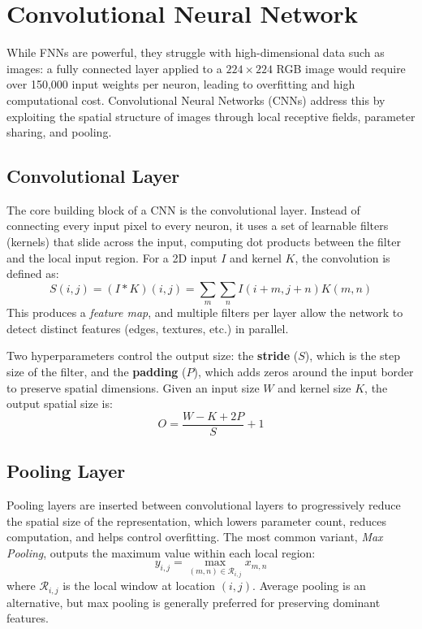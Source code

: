 \section{Convolutional Neural Network}

While FNNs are powerful, they struggle with high-dimensional data such as images: a fully connected layer applied to a $224 \times 224$ RGB image would require over 150,000 input weights per neuron, leading to overfitting and high computational cost. Convolutional Neural Networks (CNNs) address this by exploiting the spatial structure of images through local receptive fields, parameter sharing, and pooling.

\subsection{Convolutional Layer}
The core building block of a CNN is the convolutional layer. Instead of connecting every input pixel to every neuron, it uses a set of learnable filters (kernels) that slide across the input, computing dot products between the filter and the local input region. For a 2D input $I$ and kernel $K$, the convolution is defined as:
\begin{equation}
    S(i, j) = (I * K)(i, j) = \sum_{m} \sum_{n} I(i+m, j+n) K(m, n)
\end{equation}
This produces a \textit{feature map}, and multiple filters per layer allow the network to detect distinct features (edges, textures, etc.) in parallel.

Two hyperparameters control the output size: the \textbf{stride} ($S$), which is the step size of the filter, and the \textbf{padding} ($P$), which adds zeros around the input border to preserve spatial dimensions. Given an input size $W$ and kernel size $K$, the output spatial size is:
\begin{equation}
    O = \frac{W - K + 2P}{S} + 1
\end{equation}

\subsection{Pooling Layer}
Pooling layers are inserted between convolutional layers to progressively reduce the spatial size of the representation, which lowers parameter count, reduces computation, and helps control overfitting. The most common variant, \textit{Max Pooling}, outputs the maximum value within each local region:
\begin{equation}
    y_{i,j} = \max_{(m,n) \in \mathcal{R}_{i,j}} x_{m,n}
\end{equation}
where $\mathcal{R}_{i,j}$ is the local window at location $(i,j)$. Average pooling is an alternative, but max pooling is generally preferred for preserving dominant features.


